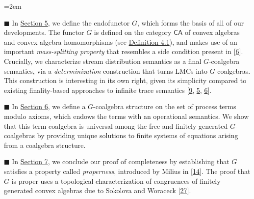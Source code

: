 \documentclass[11pt,a4paper]{amsart}
\begin{document}
\begin{list}{}{\leftmargin=2em}
\hypertarget{html:S1.I1.i4}{}
\item[]  %
\hypertarget{html:S1.I1.i4.m1}{}\({\blacksquare}\) %
\hypertarget{html:S1.I1.i4.p1}{} In \hyperlink{html:S5}{Section 5}, we define the endofunctor %
\hypertarget{html:S1.I1.i4.p1.m1}{}\({G}\), which forms the basis of all of our developments. The functor %
\hypertarget{html:S1.I1.i4.p1.m2}{}\({G}\) is defined on the category %
\hypertarget{html:S1.I1.i4.p1.m3}{}\({\mathsf{CA}}\) of convex algebras and convex algebra homomorphisms (see \hyperlink{html:S4.Thmtheorem1}{Definition 4.1}), and makes use of an important \emph{mass-splitting property} that resembles a side condition present in [\hyperlink{html:bib.bib6}{6}]. Crucially, we characterize stream distribution semantics as a final %
\hypertarget{html:S1.I1.i4.p1.m4}{}\({G}\)-coalgebra semantics, via a \emph{determinization} construction that turns LMCs into %
\hypertarget{html:S1.I1.i4.p1.m5}{}\({G}\)-coalgebras. This construction is interesting in its own right, given its simplicity compared to existing finality-based approaches to infinite trace semantics [\hyperlink{html:bib.bib9}{9}, \hyperlink{html:bib.bib5}{5}, \hyperlink{html:bib.bib6}{6}].
\par\medskip
  
\hypertarget{html:S1.I1.i5}{}
\item[]  %
\hypertarget{html:S1.I1.i5.m1}{}\({\blacksquare}\) %
\hypertarget{html:S1.I1.i5.p1}{} In \hyperlink{html:S6}{Section 6}, we define a %
\hypertarget{html:S1.I1.i5.p1.m1}{}\({G}\)-coalgebra structure on the set of process terms modulo axioms, which endows the terms with an operational semantics. We show that this term coalgebra is universal among the free and finitely generated %
\hypertarget{html:S1.I1.i5.p1.m2}{}\({G}\)-coalgebras by providing unique solutions to finite systems of equations arising from a coalgebra structure.
\par\medskip
  
\hypertarget{html:S1.I1.i6}{}
\item[]  %
\hypertarget{html:S1.I1.i6.m1}{}\({\blacksquare}\) %
\hypertarget{html:S1.I1.i6.p1}{} In \hyperlink{html:S7}{Section 7}, we conclude our proof of completeness by establishing that %
\hypertarget{html:S1.I1.i6.p1.m1}{}\({G}\) satisfies a property called \emph{properness}, introduced by Milius in [\hyperlink{html:bib.bib14}{14}]. The proof that %
\hypertarget{html:S1.I1.i6.p1.m2}{}\({G}\) is proper uses a topological characterization of congruences of finitely generated convex algebras due to Sokolova and Woraceck [\hyperlink{html:bib.bib27}{27}].
\par\medskip
  

\end{list}
\end{document}
